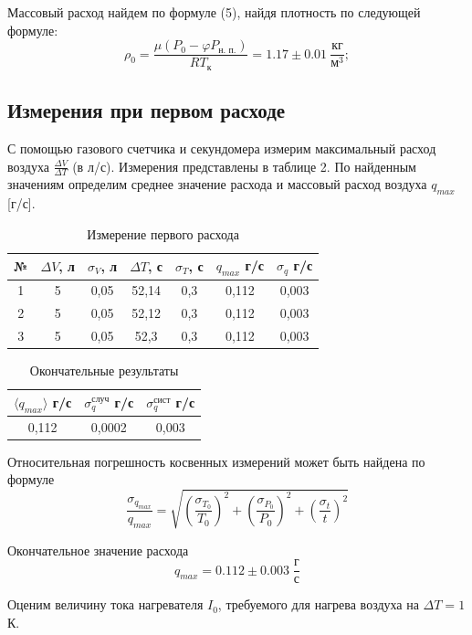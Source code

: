 \documentclass[a4paper,12pt]{article}
\begin{document}
Массовый расход найдем по формуле (5), найдя плотность по следующей формуле:
\[ \rho_0 = \frac{\mu \left(P_0 - \varphi P_{\text{н. п.}} \right)}{RT_\text{к}} = 1.17 \pm 0.01\ \frac{\text{кг}}{\text{м}^3}; \]


\subsection*{Измерения при первом расходе}
С помощью газового счетчика и секундомера измерим максимальный расход воздуха $\frac{\Delta V}{\Delta T}$ (в л/с). Измерения представлены в таблице 2. По найденным значениям определим среднее значение расхода и массовый расход воздуха $q_{max}$ [г/с].

\begin{table}[H]
    \centering
    \begin{tabular}{|c|c|c|c|c|c|c|}
    \hline
        № & $\Delta V$, л & $\sigma_V$, л & $\Delta T$, с & $\sigma_T$, с & $q_{max}$ г/с & $\sigma_q$ г/с \\ \hline
        1 & 5 & 0,05 & 52,14 & 0,3 & 0,112 & 0,003 \\ \hline
        2 & 5 & 0,05 & 52,12 & 0,3 & 0,112 & 0,003 \\ \hline
        3 & 5 & 0,05 & 52,3 & 0,3 & 0,112 & 0,003 \\ \hline
    \end{tabular}
    \caption{Измерение первого расхода}
\end{table}

\begin{table}[H]
    \centering
    \begin{tabular}{|c|c|c|}
    \hline
        $\langle q_{max} \rangle $ г/с & $\sigma_q^{случ}$ г/с & $\sigma_q^{сист}$ г/с \\ \hline
        0,112 & 0,0002 & 0,003 \\ \hline
    \end{tabular}
    \caption{Окончательные результаты}
\end{table}

Относительная погрешность косвенных измерений может быть найдена по формуле $$\frac{\sigma_{q_{max}}}{q_{max}} = \sqrt{(\frac{\sigma_{T_0}}{T_{0}})^2+(\frac{\sigma_{P_0}}{P_{0}})^2+ (\frac{\sigma_t}{t})^2}$$ 

Окончательное значение расхода 
\[ q_{max} = 0.112 \pm 0.003 \; \frac{г}{с} \] 

Оценим величину тока нагревателя $I_{0}$, требуемого для нагрева воздуха на $\Delta T = 1$ К.
	
\end{document}
